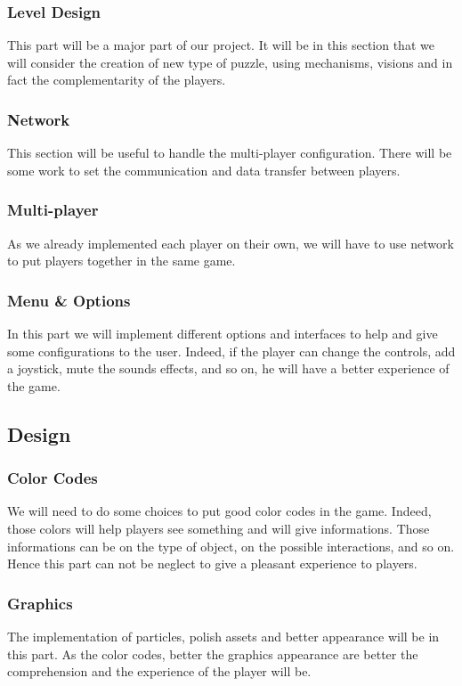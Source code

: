 \documentclass[12pt]{article}
\begin{document}
		\subsubsection{Level Design}
        	This part will be a major part of our project. It will be in this section that we will consider the creation of new type of puzzle, using mechanisms, visions and in fact the complementarity of the players.

		\subsubsection{Network}
			This section will be useful to handle the multi-player configuration. There will be some work to set the communication and data transfer between players.

		\subsubsection{Multi-player}
        	As we already implemented each player on their own, we will have to use network to put players together in the same game.
            
		\subsubsection{Menu \& Options}
        	In this part we will implement different options and interfaces to help and give some configurations to the user. Indeed, if the player can change the controls, add a joystick, mute the sounds effects, and so on, he will have a better experience of the game. 
	\newpage
	\subsection{Design}
        \subsubsection{Color Codes}
			We will need to do some choices to put good color codes in the game. Indeed, those colors will help players see something and will give informations. Those informations can be on the type of object, on the possible interactions, and so on. Hence this part can not be neglect to give a pleasant experience to players.
            
		\subsubsection{Graphics}
			The implementation of particles, polish assets and better appearance will be in this part. As the color codes, better the graphics appearance are better the comprehension and the experience of the player will be.
            
\end{document}
